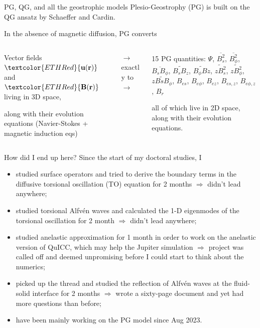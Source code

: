 \documentclass[11pt,aspectratio=169]{beamer}
\begin{document}
\begin{frame}{PG, QG, and all the geostrophic models}
	Plesio-Geostrophy (PG) \parencite{jackson_plesio-geostrophy_2020} is built on the QG ansatz by Schaeffer and Cardin.

	In the absence of magnetic diffusion, PG converts
	\vspace{1em}

	\begin{columns}
	\begin{column}{.35\linewidth}
		Vector fields $\textcolor{ETHRed}{\mathbf{u}(\mathbf{r})}$ and $\textcolor{ETHRed}{\mathbf{B}(\mathbf{r})}$ living in \textcolor{ETHRed}{3D space}, 
		
		along with their evolution equations (Navier-Stokes + magnetic induction eqs)
	\end{column}
	\begin{column}{.18\linewidth}
		$\longrightarrow$ exactly to $\longrightarrow$
	\end{column}
	\begin{column}{.35\linewidth}
		15 PG quantities: \textcolor{ETHBlue}{$\Psi$, $\overline{B_s^2}$, $\overline{B_{\phi}^2}$, $\overline{B_sB_{\phi}}$, $\widetilde{B_sB_z}$, $\widetilde{B_\phi Bz}$, $\widetilde{zB_s^2}$, $\widetilde{zB_\phi^2}$, $\widetilde{zBsB_\phi}$, $B_{es}$, $B_{e\phi}$, $B_{ez}$, $B_{es,z}$, $B_{e\phi,z}$, $B_r$}

		all of which live in \textcolor{ETHBlue}{2D space},
		along with their evolution equations.
	\end{column}
	\end{columns}
\end{frame}

\begin{frame}{How did I end up here?}
    Since the start of my doctoral studies, I
    \begin{itemize}
        \item studied surface operators and tried to derive the boundary terms in the diffusive torsional oscillation (TO) equation for \textcolor{ETHBlue}{2 months} $\Longrightarrow$ didn't lead anywhere;
        \item studied torsional Alfvén waves and calculated the 1-D eigenmodes of the torsional oscillation for \textcolor{ETHBlue}{2 month} $\Longrightarrow$ didn't lead anywhere;
        \item studied anelastic approximation for \textcolor{ETHBlue}{1 month} in order to work on the anelastic version of QuICC, which may help the Jupiter simulation $\Longrightarrow$ project was called off and deemed unpromising before I could start to think about the numerics;
        \item picked up the thread and studied the reflection of Alfvén waves at the fluid-solid interface for \textcolor{ETHBlue}{2 months} $\Longrightarrow$ wrote a sixty-page document and yet had more questions than before;
        \item have been mainly working on the PG model since Aug 2023.
    \end{itemize}
\end{frame}
\end{document}
